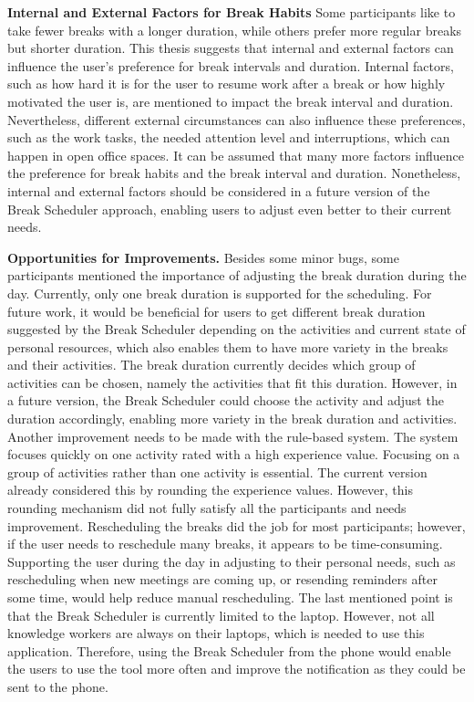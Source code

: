 \documentclass{hasel_thesis}
\begin{document}
\textbf{Internal and External Factors for Break Habits} Some participants like to take fewer breaks with a longer duration, while others prefer more regular breaks but shorter duration. This thesis suggests that internal and external factors can influence the user's preference for break intervals and duration. Internal factors, such as how hard it is for the user to resume work after a break or how highly motivated the user is, are mentioned to impact the break interval and duration. Nevertheless, different external circumstances can also influence these preferences, such as the work tasks, the needed attention level and interruptions, which can happen in open office spaces. It can be assumed that many more factors influence the preference for break habits and the break interval and duration. Nonetheless, internal and external factors should be considered in a future version of the Break Scheduler approach, enabling users to adjust even better to their current needs.

\textbf{Opportunities for Improvements.} Besides some minor bugs, some participants mentioned the importance of adjusting the break duration during the day. Currently, only one break duration is supported for the scheduling. For future work, it would be beneficial for users to get different break duration suggested by the Break Scheduler depending on the activities and current state of personal resources, which also enables them to have more variety in the breaks and their activities. The break duration currently decides which group of activities can be chosen, namely the activities that fit this duration. However, in a future version, the Break Scheduler could choose the activity and adjust the duration accordingly, enabling more variety in the break duration and activities. Another improvement needs to be made with the rule-based system. The system focuses quickly on one activity rated with a high experience value. Focusing on a group of activities rather than one activity is essential. The current version already considered this by rounding the experience values. However, this rounding mechanism did not fully satisfy all the participants and needs improvement. Rescheduling the breaks did the job for most participants; however, if the user needs to reschedule many breaks, it appears to be time-consuming. Supporting the user during the day in adjusting to their personal needs, such as rescheduling when new meetings are coming up, or resending reminders after some time, would help reduce manual rescheduling. The last mentioned point is that the Break Scheduler is currently limited to the laptop. However, not all knowledge workers are always on their laptops, which is needed to use this application. Therefore, using the Break Scheduler from the phone would enable the users to use the tool more often and improve the notification as they could be sent to the phone. 
\end{document}
